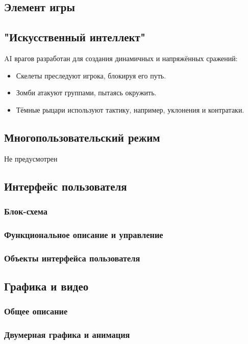 \documentclass{article}
\begin{document}
\subsection{Элемент игры}

\subsection{"Искусственный интеллект"}
AI врагов разработан для создания динамичных и напряжённых сражений:
\begin{itemize}
    \item Скелеты преследуют игрока, блокируя его путь.
    \item Зомби атакуют группами, пытаясь окружить.
    \item Тёмные рыцари используют тактику, например, уклонения и контратаки.
\end{itemize}
\subsection{Многопользовательский режим}
Не предусмотрен
\subsection{Интерфейс пользователя}

\subsubsection{Блок-схема}
\subsubsection{Функциональное описание и управление}
\subsubsection{Объекты интерфейса пользователя}

\subsection{Графика и видео}

\subsubsection{Общее описание}
\subsubsection{Двумерная графика и анимация}
\end{document}
